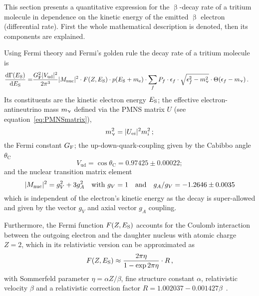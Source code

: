 This section presents a quantitative expression for the $\upbeta$-decay rate of a tritium molecule in dependence on the kinetic energy of the emitted $\upbeta$ electron (differential rate). First the whole mathematical description is denoted, then its components are explained.

Using Fermi theory and Fermi's golden rule the decay rate of a tritium molecule is~\cite{Kleesiek2019,Otten:2008zz} 
\begin{align}
\label{eq:intSpecModelDiffSpec}
\frac{\mathop{}\!\mathrm{d}\Gamma(E_\mathrm{S})}{\mathop{}\!\mathrm{d} E_\mathrm{S}} = &
\frac{G_\mathrm{F}^2 \lvert V_\mathrm{ud}\rvert^2}{2 \pi^3}
\lvert M_\mathrm{nuc}\rvert^2 \cdot
F(Z, E_\mathrm{S}) \cdot 
p(E_\mathrm{S}+m_{\mathrm{e}}) \cdot 
\sum_{f} 
	P_f \cdot 
	\epsilon_f \cdot 
	\sqrt{\epsilon_f^2-m_\upnu^2} \cdot 
	\Theta(\epsilon_f-m_\upnu)
	\text{\,.}
\end{align}
Its constituents are the kinetic electron energy $E_\mathrm{S}$;
the effective electron-antineutrino mass $m_\upnu$ defined via the PMNS matrix $U$ (see equation~\ref{eq:PMNSmatrix}),
\begin{equation}
	 m_\upnu^2 = \lvert U_{\mathrm{e} i}\rvert^2 m_i^2\,;
\end{equation}
the Fermi constant $G_\mathrm{F}$;
the up-down-quark-coupling given by the Cabibbo angle $\theta_\mathrm{C}$~\cite{ReviewOfParticlePhysics}
\begin{equation}
V_\mathrm{ud} = \cos \theta_\mathrm{C} = 
0.97425\pm0.00022;
\end{equation}
and the nuclear transition matrix element~\cite{ReviewOfParticlePhysics}
\begin{equation}
\lvert M_\mathrm{nuc}\rvert^2 = g_V^2+3g_A^2 \quad
\text{with } g_V = 1 \quad
\text{and} \quad g_A/g_V = -1.2646 \pm 0.0035
\end{equation}
which is independent of the electron's kinetic energy as the decay is super-allowed and given by the vector $g_V$ and axial vector $g_A$ coupling.

Furthermore, the Fermi function $F(Z,E_\mathrm{S})$ accounts for the Coulomb interaction between the outgoing electron and the daughter nucleus with atomic charge $Z=2$, which in its relativistic version can be approximated as~\cite{Simpson1981}
\begin{equation}
F(Z,E_\mathrm{S}) \approx \frac{2 \pi \eta}{1-\exp{2 \pi \eta}} \cdot R
\text{\,,}
\end{equation}
with Sommerfeld parameter $\eta = \alpha Z / \beta$, fine structure constant $\alpha$, relativistic velocity $\beta$ and a relativistic correction factor $R = 1.002037-0.001427\beta$~\cite{Kleesiek2019}.

